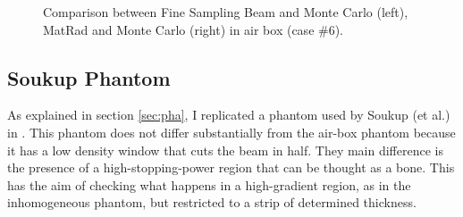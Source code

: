 \documentclass[12pt, a4paper, twoside]{book}
\begin{document}
\begin{figure}[!ht]
\centering
{} 
\caption{Comparison between Fine Sampling Beam and Monte Carlo (left), MatRad and Monte Carlo (right) in air box (case \#6).}
\label{fig:AB6gam}
\end{figure}
\newpage

\subsection{Soukup Phantom}
As explained in section \ref{sec:pha}, I replicated a phantom used by Soukup (et al.) in \cite{souk:pba}. 
This phantom does not differ substantially from the air-box phantom because it has a low density window that cuts the beam in half. They main difference is the presence of a high-stopping-power region that can be thought as a bone. This has the aim of checking what happens in a high-gradient region, as in the inhomogeneous phantom, but restricted to a strip of determined thickness.
\end{document}
